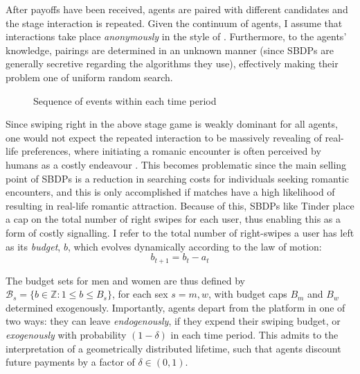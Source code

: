 After payoffs have been received, agents are paired with different candidates and the stage interaction is repeated. Given the continuum of agents, I assume that interactions take place \textit{anonymously} in the style of \cite{jovanovic1988anonymous}. Furthermore, to the agents' knowledge, pairings are determined in an unknown manner (since SBDPs are generally secretive regarding the algorithms they use), effectively making their problem one of uniform random search.

\begin{figure}[ht]
    \centering 
    \caption{Sequence of events within each time period}
    \vspace{20pt} 
    \label{fig:timeline}
\end{figure}

Since swiping right in the above stage game is weakly dominant for all agents, one would not expect the repeated interaction to be massively revealing of real-life preferences, where initiating a romanic encounter is often perceived by humans as a costly endeavour \citep{dawkins2017selfish}. This becomes problematic since the main selling point of SBDPs is a reduction in searching costs for individuals seeking romantic encounters, and this is only accomplished if matches have a high likelihood of resulting in real-life romantic attraction. Because of this, SBDPs like Tinder place a cap on the total number of right swipes for each user, thus enabling this as a form of costly signalling. I refer to the total number of right-swipes a user has left as its \textit{budget}, $b$, which evolves dynamically according to the law of motion: 
\begin{equation*} 
  b_{t+1}= b_{t}- a_{t} 
\end{equation*}

The budget sets for men and women are thus defined by $\mathcal{B}_{s}=\{b \in \mathbb{Z} : 1\leq b \leq B_s\}$, for each sex $s=m,w$, with budget caps $B_m$ and $B_w$ determined exogenously. Importantly, agents depart from the platform in one of two ways: they can leave \textit{endogenously}, if they expend their swiping budget, or \textit{exogenously} with probability $(1-\delta)$ in each time period. This admits to the interpretation of a geometrically distributed lifetime, such that agents discount future payments by a factor of $\delta\in(0,1)$. 

